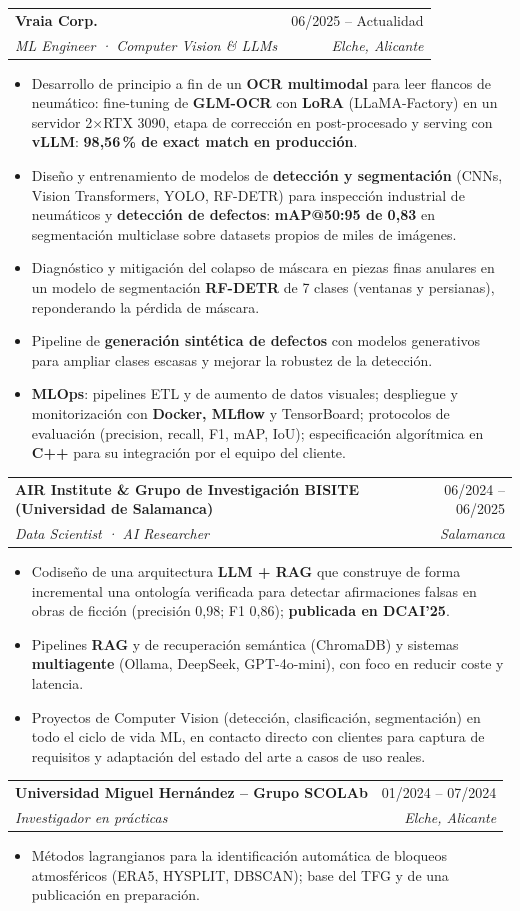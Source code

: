 \documentclass[a4paper,11pt]{article}
\makeatletter
\newcommand{\resumeItem}[1]{\item\small{#1 \vspace{-2pt}}}
\newcommand{\resumeSubheading}[4]{
  \vspace{-1pt}\item
    \begin{tabular*}{\textwidth}[t]{l@{\extracolsep{\fill}}r}
      \textbf{#1} & #2 \\
      \textit{\small#3} & \textit{\small #4} \\
    \end{tabular*}\vspace{-5pt}
}
\newcommand{\resumeItemListStart}{\begin{itemize}[leftmargin=0.18in, itemsep=0pt, topsep=1pt, parsep=0pt]}
\newcommand{\resumeItemListEnd}{\end{itemize}\vspace{-5pt}}
\makeatother
\begin{document}
  \resumeSubheading
    {Vraia Corp.}{06/2025 -- Actualidad}
    {ML Engineer · Computer Vision \& LLMs}{Elche, Alicante}
    \resumeItemListStart
      \resumeItem{Desarrollo de principio a fin de un \textbf{OCR multimodal} para leer flancos de neumático: fine-tuning de \textbf{GLM-OCR} con \textbf{LoRA} (LLaMA-Factory) en un servidor 2$\times$RTX 3090, etapa de corrección en post-procesado y serving con \textbf{vLLM}: \textbf{98,56\,\% de exact match en producción}.}
      \resumeItem{Diseño y entrenamiento de modelos de \textbf{detección y segmentación} (CNNs, Vision Transformers, YOLO, RF-DETR) para inspección industrial de neumáticos y \textbf{detección de defectos}: \textbf{mAP@50:95 de 0,83} en segmentación multiclase sobre datasets propios de miles de imágenes.}
      \resumeItem{Diagnóstico y mitigación del colapso de máscara en piezas finas anulares en un modelo de segmentación \textbf{RF-DETR} de 7 clases (ventanas y persianas), reponderando la pérdida de máscara.}
      \resumeItem{Pipeline de \textbf{generación sintética de defectos} con modelos generativos para ampliar clases escasas y mejorar la robustez de la detección.}
      \resumeItem{\textbf{MLOps}: pipelines ETL y de aumento de datos visuales; despliegue y monitorización con \textbf{Docker, MLflow} y TensorBoard; protocolos de evaluación (precision, recall, F1, mAP, IoU); especificación algorítmica en \textbf{C++} para su integración por el equipo del cliente.}
    \resumeItemListEnd

  \resumeSubheading
    {AIR Institute \& Grupo de Investigación BISITE (Universidad de Salamanca)}{06/2024 -- 06/2025}
    {Data Scientist · AI Researcher}{Salamanca}
    \resumeItemListStart
      \resumeItem{Codiseño de una arquitectura \textbf{LLM + RAG} que construye de forma incremental una ontología verificada para detectar afirmaciones falsas en obras de ficción (precisión 0,98; F1 0,86); \textbf{publicada en DCAI'25}.}
      \resumeItem{Pipelines \textbf{RAG} y de recuperación semántica (ChromaDB) y sistemas \textbf{multiagente} (Ollama, DeepSeek, GPT-4o-mini), con foco en reducir coste y latencia.}
      \resumeItem{Proyectos de Computer Vision (detección, clasificación, segmentación) en todo el ciclo de vida ML, en contacto directo con clientes para captura de requisitos y adaptación del estado del arte a casos de uso reales.}
    \resumeItemListEnd

  \resumeSubheading
    {Universidad Miguel Hernández -- Grupo SCOLAb}{01/2024 -- 07/2024}
    {Investigador en prácticas}{Elche, Alicante}
    \resumeItemListStart
      \resumeItem{Métodos lagrangianos para la identificación automática de bloqueos atmosféricos (ERA5, HYSPLIT, DBSCAN); base del TFG y de una publicación en preparación.}
    \resumeItemListEnd
\end{document}
